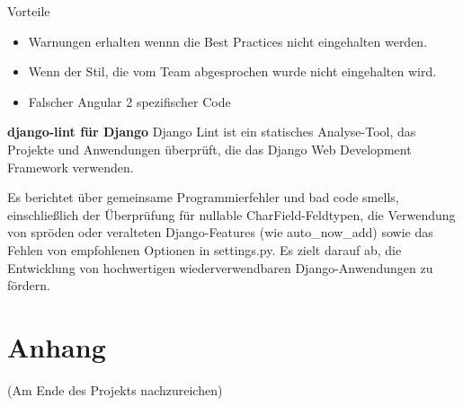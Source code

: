 \documentclass[accentcolor=tud0b,12pt,paper=a4]{tudreport}
\begin{document}
Vorteile
\begin{itemize}
\item Warnungen erhalten wennn die Best Practices nicht eingehalten werden.
\item Wenn der Stil, die vom Team abgesprochen wurde nicht eingehalten wird.
\item Falscher Angular 2 spezifischer Code
\end{itemize}

\textbf{django-lint für Django}
Django Lint ist ein statisches Analyse-Tool, das Projekte und Anwendungen überprüft, die das Django Web Development Framework verwenden.

Es berichtet über gemeinsame Programmierfehler und bad code smells, einschließlich der Überprüfung für nullable CharField-Feldtypen, die Verwendung von spröden oder veralteten Django-Features (wie auto_now_add) sowie das Fehlen von empfohlenen Optionen in settings.py. Es zielt darauf ab, die Entwicklung von hochwertigen wiederverwendbaren Django-Anwendungen zu fördern.





\appendix
	\chapter{Anhang}
		(Am Ende des Projekts nachzureichen)\\
\end{document}

